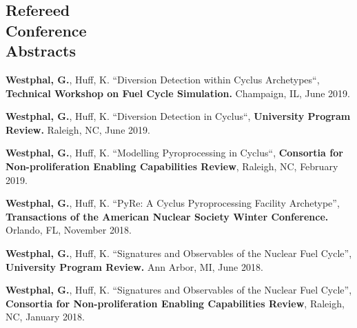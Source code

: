 \documentclass[margin,line]{resume}
\begin{document}
\begin{resume}
    \section{\mysidestyle Refereed\\Conference\\Abstracts}
    \begin{bibenum} 
    \item \textbf{Westphal, G.}, Huff, K. ``Diversion Detection within Cyclus Archetypes``,
    		\textbf{Technical Workshop on Fuel Cycle Simulation.}
    		Champaign, IL, June 2019.
    \item \textbf{Westphal, G.}, Huff, K. ``Diversion Detection in Cyclus``,
    		\textbf{University Program Review.}
    		Raleigh, NC, June 2019.
    \item \textbf{Westphal, G.}, Huff, K. ``Modelling Pyroprocessing in Cyclus``,
    		\textbf{Consortia for Non-proliferation Enabling Capabilities Review},
    		Raleigh, NC, February 2019.
    \item \textbf{Westphal, G.}, Huff, K. ``PyRe: A Cyclus Pyroprocessing Facility Archetype'', 
            \textbf{Transactions of the American Nuclear Society Winter Conference.} 
            Orlando, FL, November 2018.  
    \item \textbf{Westphal, G.}, Huff, K. ``Signatures and Observables of the Nuclear Fuel Cycle'', 
            \textbf{University Program Review.} 
            Ann Arbor, MI, June 2018.
    \item \textbf{Westphal, G.}, Huff, K. ``Signatures and Observables of the Nuclear Fuel Cycle'', 
    		\textbf{Consortia for Non-proliferation Enabling Capabilities Review}, 
    		Raleigh, NC, January 2018.
    \end{bibenum}
      

\end{resume}
\end{document}
